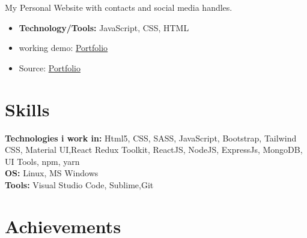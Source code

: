 \documentclass[letterpaper, 11pt]{article}
\newcommand{\bulletSpace}{\vspace{-8pt}}
\newcommand{\secStartSpace}{\vspace{3pt}}
\newcommand{\secEndSpace}{\vspace{5pt}}
\newcommand{\spaceCollapse}{\vspace{-5pt}}
\begin{document}
\begin{addmargin}[1em]{1em}
	\noindent My Personal Website with contacts and social media handles.
	\spaceCollapse
	\begin{itemize}
		\item \textbf{Technology/Tools:} JavaScript, CSS, HTML
		      \bulletSpace
		\item working demo:  \href{https://sukhlotey.github.io/imSukhpreet/}{\underline{Portfolio}}
           \item Source:  \href{https://github.com/sukhlotey/imSukhpreet}{\underline{Portfolio}}
	\end{itemize}
		
\end{addmargin}
\secEndSpace

\section{\color{blue} \textbf{Skills}}
\secStartSpace

\begin{addmargin}[1em]{1em}
	\noindent \textbf{Technologies i work in:} Html5, CSS, SASS, JavaScript, Bootstrap, Tailwind CSS, Material UI,React Redux Toolkit, ReactJS, NodeJS, ExpressJs, MongoDB, UI Tools, npm, yarn \\
	\noindent \textbf{OS:} Linux, MS Windows\\
	\noindent \textbf{Tools:} Visual Studio Code, Sublime,Git
\end{addmargin}
\secEndSpace


\section{\color{blue} \textbf{Achievements}}
\secStartSpace
\end{document}
